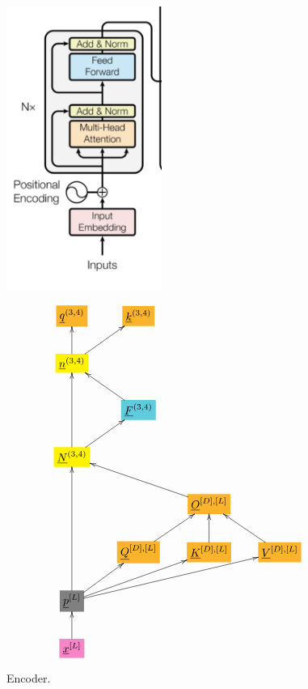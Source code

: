 \documentclass[12pt]{article}
\begin{document}
\begin{figure}[h!]\centering
\begin{minipage}{.5\linewidth}
\includegraphics[width=2in]{encoder.jpg}
\end{minipage}%
\begin{minipage}{.5\linewidth}
$$\xymatrix{
*+[F*:Dandelion]{\underline{q}^{(3, 4)}}&*+[F*:Dandelion]{\underline{k}^{(3, 4)}}&&
\\
*+[F*:yellow]{\underline{n}^{(3, 4)}}\ar[u]\ar[ur]&&&
\\
&*+[F*:SkyBlue]{\underline{F}^{(3, 4)}}\ar[ul]&&
\\
*+[F*:yellow]{\underline{N}^{(3, 4)}}\ar[uu]\ar[ur]&&&
\\
&&*+[F*:Dandelion]{\underline{O}^{[D], [L]}}\ar[ull]&
\\
&*+[F*:Dandelion]{\underline{Q}^{[D], [L]}}\ar[ur]&*+[F*:Dandelion]{\underline{K}^{[D], [L]}}\ar[u]&*+[F*:Dandelion]{\underline{V}^{[D],[L]}}\ar[ul]
\\
*+[F*:gray]{\underline{p}^{[L]}}\ar[uuu]\ar[ur]\ar[urr]\ar[urrr]&&&
\\
*+[F*:Lavender]{\underline{x}^{[L]}}\ar[u]&&&
}$$
\end{minipage}
\caption{Encoder.}
\label{fig-texnn-for-encoder}
\end{figure}
\end{document}
